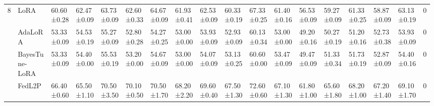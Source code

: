 \begin{table*}[]
\begin{scriptsize}
{\begin{tabular}{c|l|l|l|l|l|l|l|l|l|l|l|l|l|l|l|l|c}
\multirow{5}{*}{8}  & LoRA                                   & 60.60±0.28                        & 62.47±0.09                       & 63.73±0.09                       & 62.60±0.33                        & 64.67±0.09                       & 61.93±0.41                       & 62.53±0.09                       & 60.33±0.19                       & 67.33±0.25                       & 61.40±0.16                        & 56.53±0.09                       & 59.27±0.09                       & 61.33±0.25                       & 58.87±0.09                       & 63.13±0.19                       & 0             \\ %
                    & AdaLoRA                              & 53.33±0.09                       & 54.53±0.19                       & 55.27±0.09                       & 52.80±0.28                        & 54.27±0.25                       & 53.00±0.00                        & 53.93±0.09                       & 52.93±0.09                       & 60.13±0.34                       & 53.00±0.00                        & 49.20±0.16                        & 50.27±0.19                       & 51.20±0.16                        & 52.73±0.38                       & 53.93±0.09                       & 0             \\ %
                    & BayesTune-LoRA                            & 53.33±0.09                       & 54.40±0.00                        & 55.53±0.19                       & 53.20±0.00                        & 54.67±0.09                       & 53.00±0.00                        & 54.07±0.09                       & 53.13±0.25                       & 60.60±0.00                        & 53.47±0.09                       & 49.47±0.09                       & 51.33±0.34                       & 51.73±0.19                       & 52.87±0.09                       & 54.40±0.16                        & 0             \\ %
                    & FedL2P                               & 66.40±0.60                       & 65.50±1.10                        & 70.50±3.50                        & 70.10±0.50                        & 70.50±1.70                        & 68.20±2.20                       & 69.60±0.40                        & 67.50±1.30                        & 72.60±0.60                       & 67.10±1.30                        & 61.80±1.00                        & 65.60±1.80                        & 68.20±1.00                        & 67.20±1.40                        & 69.10±1.70                        & 0             \\ %

\end{tabular}}
\end{scriptsize}
\end{table*}
